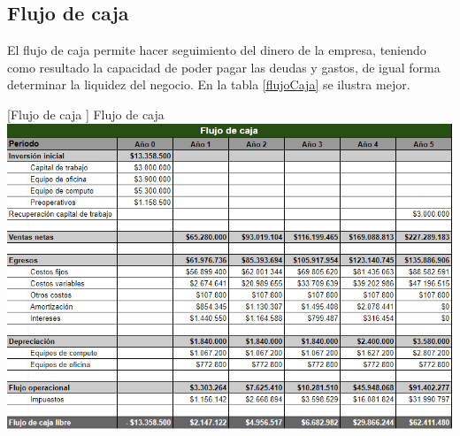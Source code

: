 \subsection{Flujo de caja}

El flujo de caja permite hacer seguimiento del dinero de la empresa, teniendo como resultado la capacidad de poder pagar las deudas y gastos, de igual forma determinar la liquidez del negocio. En la tabla \ref{flujoCaja} se ilustra mejor.

\vspace{2mm}
\begin{minipage}{0.8\textwidth}
\centering
{}[{Flujo de caja }]{ Flujo de caja }
\label{flujoCaja}
\includegraphics[width=1.2\textwidth]{Images/flujoCaja.png}
\end{minipage}
\newpage